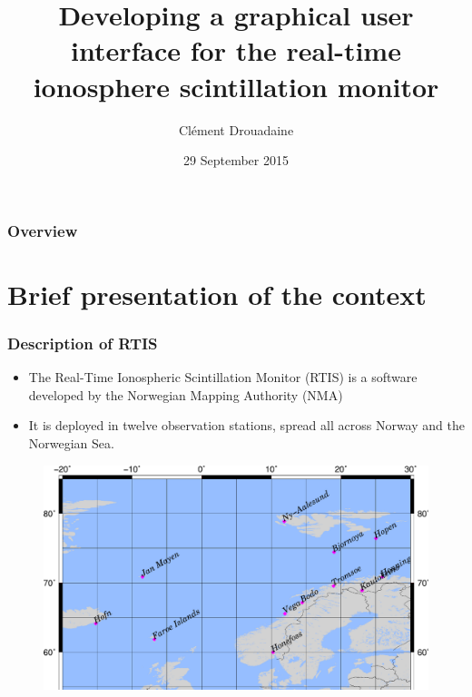 \documentclass{beamer}
\title[Developing a GUI for the RTIS monitor]{Developing a graphical user interface for the real-time ionosphere scintillation monitor} %
\author{Clément Drouadaine} %
\institute[ENSG - NMA] %
{
École Nationale des Sciences Géographiques \\ %
\medskip
National Mapping Authority
}
\date{29 September 2015} %
\begin{document}
\begin{frame}
\titlepage %
\end{frame}

\begin{frame}
\frametitle{Overview} %
\tableofcontents %
\end{frame}


\section{Brief presentation of the context}

\begin{frame}
\frametitle{Description of RTIS}
\begin{itemize}
\item The Real-Time Ionospheric Scintillation Monitor (RTIS) is a software developed by the Norwegian Mapping Authority (NMA)
\item It is deployed in twelve observation stations, spread all across Norway and the Norwegian Sea. %
\end{itemize}

\begin{figure}
	\includegraphics[width=0.7\linewidth]{images/rtisMap}
\end{figure}

\end{frame}
\end{document}
